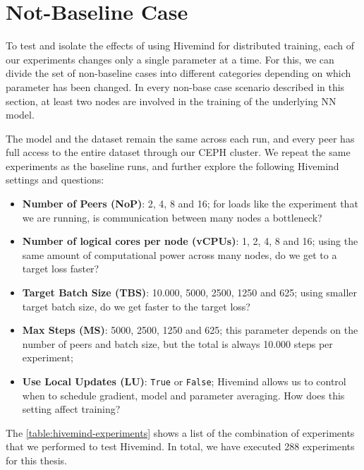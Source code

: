 \section{Not-Baseline Case}

To test and isolate the effects of using Hivemind for distributed training, each of our experiments changes only a single parameter at a time.
For this, we can divide the set of non-baseline cases into different categories depending on which parameter has been changed.
In every non-base case scenario described in this section, at least two nodes are involved in the training of the underlying NN model.

The model and the dataset remain the same across each run, and every peer has full access to the entire dataset through our CEPH cluster.
We repeat the same experiments as the baseline runs, and further explore the following Hivemind settings and questions:
\begin{itemize}
    \item \textbf{Number of Peers (NoP)}: 2, 4, 8 and 16; for loads like the experiment that we are running, is communication between many nodes a bottleneck?
    \item \textbf{Number of logical cores per node (vCPUs)}: 1, 2, 4, 8 and 16; using the same amount of computational power across many nodes, do we get to a target loss faster?
    \item \textbf{Target Batch Size (TBS)}: 10.000, 5000, 2500, 1250 and 625; using smaller target batch size, do we get faster to the target loss?
    \item \textbf{Max Steps (MS)}: 5000, 2500, 1250 and 625; this parameter depends on the number of peers and batch size, but the total is always 10.000 steps per experiment;
    \item \textbf{Use Local Updates (LU)}: \texttt{True} or \texttt{False}; Hivemind allows us to control when to schedule gradient, model and parameter averaging. How does this setting affect training?
\end{itemize}

The \autoref{table:hivemind-experiments} shows a list of the combination of experiments that we performed to test Hivemind.
In total, we have executed 288 experiments for this thesis.

